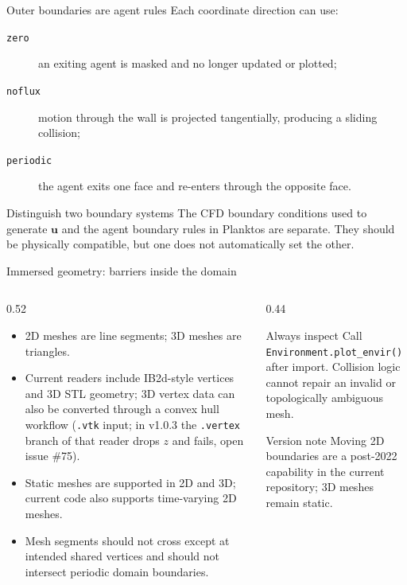 \documentclass[aspectratio=169,11pt]{beamer}
\newcommand{\uu}{\bm{u}}
\newcommand{\code}[1]{\texttt{#1}}
\begin{document}
\begin{frame}{Outer boundaries are agent rules}
Each coordinate direction can use:
\begin{description}
  \item[\code{zero}] an exiting agent is masked and no longer updated or plotted;
  \item[\code{noflux}] motion through the wall is projected tangentially, producing a sliding collision;
  \item[\code{periodic}] the agent exits one face and re-enters through the opposite face.
\end{description}
\begin{alertblock}{Distinguish two boundary systems}
The CFD boundary conditions used to generate $\uu$ and the agent boundary rules in Planktos are separate. They should be physically compatible, but one does not automatically set the other.
\end{alertblock}
\end{frame}

\begin{frame}{Immersed geometry: barriers inside the domain}
\begin{columns}[T,onlytextwidth]
  \begin{column}{0.52\textwidth}
    \begin{itemize}
      \item 2D meshes are line segments; 3D meshes are triangles.
      \item Current readers include IB2d-style vertices and 3D STL geometry; 3D vertex data can also be converted through a convex hull workflow (\code{.vtk} input; in v1.0.3 the \code{.vertex} branch of that reader drops $z$ and fails, open issue \#75).
      \item Static meshes are supported in 2D and 3D; current code also supports time-varying 2D meshes.
      \item Mesh segments should not cross except at intended shared vertices and should not intersect periodic domain boundaries.
    \end{itemize}
  \end{column}
  \begin{column}{0.44\textwidth}
    \begin{block}{Always inspect}
      Call \code{Environment.plot\_envir()} after import. Collision logic cannot repair an invalid or topologically ambiguous mesh.
    \end{block}
    \begin{block}{Version note}
      Moving 2D boundaries are a post-2022 capability in the current repository; 3D meshes remain static.
    \end{block}
  \end{column}
\end{columns}
\end{frame}
\end{document}
